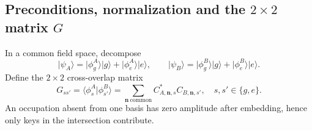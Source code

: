\documentclass[11pt,a4paper]{article}
\newcommand{\ket}[1]{\lvert #1\rangle}
\begin{document}
\subsection{Preconditions, normalization and the $2\times2$ matrix $G$}

In a common field space, decompose
\begin{equation}
\ket{\psi_A}=\ket{\phi_g^A}\ket g+\ket{\phi_e^A}\ket e,
\qquad
\ket{\psi_B}=\ket{\phi_g^B}\ket g+\ket{\phi_e^B}\ket e.
\end{equation}
Define the $2\times2$ cross-overlap matrix
\begin{equation}
G_{ss'}=\langle\phi_s^A|\phi_{s'}^B\rangle
=\sum_{\mathbf n\ \text{common}}
 C_{A,\mathbf n,s}^*C_{B,\mathbf n,s'},
\quad s,s'\in\{g,e\}.
\label{eq:G}
\end{equation}
An occupation absent from one basis has zero amplitude after embedding, hence
only keys in the intersection contribute.
\end{document}
